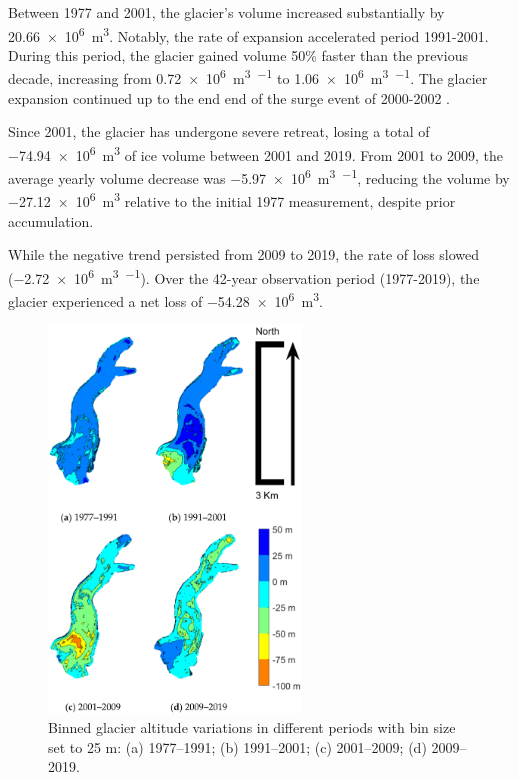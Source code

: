 {{Between 1977 and 2001, the glacier’s volume increased substantially by \SI[retain-explicit-plus]{+20.66e6}{\cubic\meter}.
Notably, the rate of expansion accelerated period 1991-2001.
During this period, the glacier gained volume 50\% faster than the previous decade, increasing from \SI[retain-explicit-plus]{+0.72e6}{\cubic\meter\per\year} to \SI[retain-explicit-plus]{+1.06e6}{\cubic\meter\per\year}.
The glacier expansion continued up to the end end of the surge event of 2000-2002 \citep{Haeberli2002, Kaab2004, Mortara2009}.

Since 2001, the glacier has undergone severe retreat, losing a total of \SI{-74.94e6}{\cubic\meter} of ice volume between 2001 and 2019.
From 2001 to 2009, the average yearly volume decrease was \SI{-5.97e6}{\cubic\meter\per\year}, reducing the volume by \SI{-27.12e6}{\cubic\meter} relative to the initial 1977 measurement, despite prior accumulation.

While the negative trend persisted from 2009 to 2019, the rate of loss slowed (\SI{-2.72e6}{\cubic\meter\per\year}).
Over the 42-year observation period (1977-2019), the glacier experienced a net loss of \SI{-54.28e6}{\cubic\meter}.

\begin{figure}
    \centering
    \includegraphics[width=0.6\textwidth]{results_volumes_variations.png}
    \caption{Binned glacier altitude variations in different periods with bin size set to 25 m: (a) 1977–1991; (b) 1991–2001; (c) 2001–2009; (d) 2009–2019. }
    \label{fig:2:volume_variations}
\end{figure}

}}
